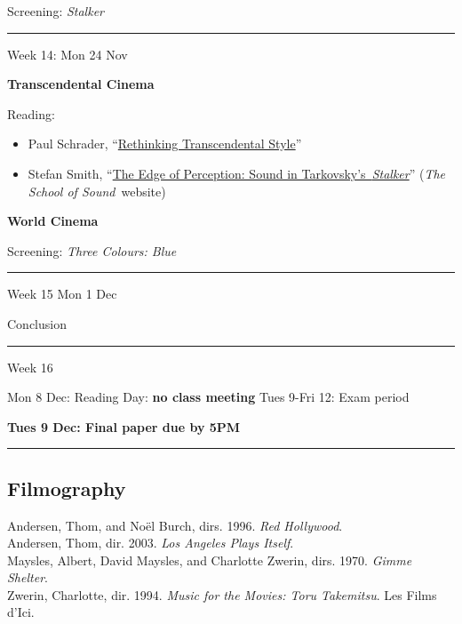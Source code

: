 \documentclass[
  letterpaper,
  DIV=11,
  numbers=noendperiod,
  oneside]{scrartcl}
\providecommand{\tightlist}{%
  \setlength{\itemsep}{0pt}\setlength{\parskip}{0pt}}
\begin{document}
Screening: \emph{Stalker}

\begin{center}\rule{0.5\linewidth}{0.5pt}\end{center}

Week 14: Mon 24 Nov

\textbf{Transcendental Cinema}

Reading:

\begin{itemize}
\tightlist
\item
  Paul Schrader,
  ``\href{https://mroberts.emerson.build/courses/vm402-01/fa24/pdf/rethinking-transcendental-style.pdf}{Rethinking
  Transcendental Style}''
\item
  Stefan Smith,
  ``\href{https://canvas.emerson.edu/courses/2040561/files/168961381?wrap=1}{The
  Edge of Perception: Sound in Tarkovsky's~\emph{Stalker}}'' (\emph{The
  School of Sound}~website)
\end{itemize}

\textbf{World Cinema}

Screening: \emph{Three Colours: Blue}

\begin{center}\rule{0.5\linewidth}{0.5pt}\end{center}

Week 15 Mon 1 Dec

Conclusion

\begin{center}\rule{0.5\linewidth}{0.5pt}\end{center}

Week 16

Mon 8 Dec: Reading Day: \textbf{no class meeting} Tues 9-Fri 12: Exam
period

\textbf{Tues 9 Dec: Final paper due by 5PM}

\begin{center}\rule{0.5\linewidth}{0.5pt}\end{center}

\subsection{Filmography}\label{filmography}

Andersen, Thom, and Noël Burch, dirs. 1996. \emph{Red Hollywood}.\\
Andersen, Thom, dir. 2003. \emph{Los Angeles Plays Itself}.\\
Maysles, Albert, David Maysles, and Charlotte Zwerin, dirs. 1970.
\emph{Gimme Shelter}.\\
Zwerin, Charlotte, dir. 1994. \emph{Music for the Movies: Toru
Takemitsu}. Les Films d'Ici.
\end{document}
